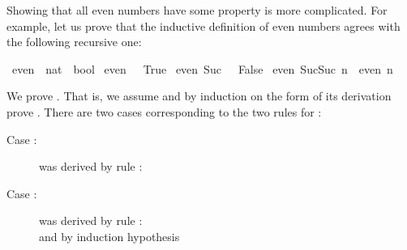\begin{isabellebody}
\begin{isamarkuptext}
Showing that all even numbers have some property is more complicated.  For
example, let us prove that the inductive definition of even numbers agrees
with the following recursive one:%
\end{isamarkuptext}%
\isamarkuptrue%
\isamarkupfalse%
\ even\ {}{}\ {}nat\ {}\ bool{}\ \isanewline
{}even\ {}\ {}\ True{}\ {}\isanewline
{}even\ {}Suc\ {}{}\ {}\ False{}\ {}\isanewline
{}even\ {}Suc{}Suc\ n{}{}\ {}\ even\ n{}%
\begin{isamarkuptext}%
We prove .  That is, we
assume  and by induction on the form of its derivation
prove . There are two cases corresponding to the two rules
for :
\begin{description}
\item[Case :]
  was derived by rule : \\
    
\item[Case :]
  was derived by rule : \\
  and by induction hypothesis \\
 
\end{description}


\end{isamarkuptext}
\end{isabellebody}
